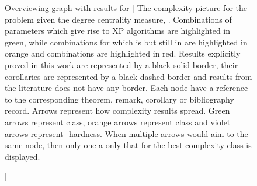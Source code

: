 \begin{figure}[t]
    \caption
    [Overviewing graph with results for \HLdeg]
    {
        The complexity picture for the \HL problem given the degree centrality measure, \HLdeg.
        Combinations of parameters which give rise to XP algorithms are highlighted in green,
        while combinations for which \HLdeg is \Wh but still in \XP are highlighted in orange and \pNP combinations
        are highlighted in red.
        Results explicitly proved in this work are represented by a black solid border,
        their corollaries are represented by a black dashed border and
        results from the literature does not have any border.
        Each node have a reference to the corresponding theorem, remark, corollary or bibliography record.
        Arrows represent how complexity results spread.
        Green arrows represent \FPT class, orange arrows represent \XP class
        and violet arrows represent \W-hardness.
        When multiple arrows would aim to the same node, then only one a only that for the best complexity class is displayed.  
    }
    \label{fig:complexityPicture}
\end{figure}
